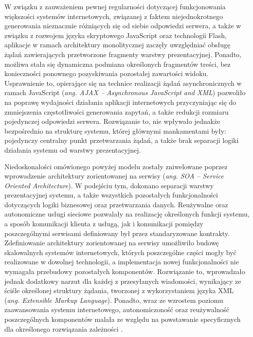W związku z zauważeniem pewnej regularności dotyczącej funkcjonowania większości systemów internetowych, związanej z faktem niejednokrotnego generowania nieznacznie różniących się od siebie odpowiedzi serwera, a także w związku z rozwojem języka skryptowego JavaScript oraz technologii Flash, aplikacje w ramach architektury monolitycznej zaczęły uwzględniać obsługę żądań zawierających przetworzone fragmenty warstwy prezentacyjnej. Ponadto, możliwa stała się dynamiczna podmiana określonych fragmentów treści, bez konieczności ponownego pozyskiwania pozostałej zawartości widoku. Usprawnienie to, opierające się na technice realizacji żądań asynchronicznych w ramach JavaScript (\textit{ang. AJAX -- Asynchronous JavaScript and XML}) pozwoliło na poprawę wydajności działania aplikacji internetowych przyczyniając się do zmniejszenia częstotliwości generowania zapytań, a także redukcji rozmiaru pojedynczej odpowiedzi serwera. Rozwiązanie to, nie wpływało jednakże bezpośrednio na strukturę systemu, której głównymi mankamentami były: pojedynczy centralny punkt przetwarzania żądań, a także brak separacji logiki działania systemu od warstwy prezentacyjnej.

Niedoskonałości omówionego powyżej modelu zostały zniwelowane poprzez wprowadzenie architektury zorientowanej na serwisy (\textit{ang. SOA -- Service Oriented Architecture}). W podejściu tym, dokonano separacji warstwy prezentacyjnej systemu, a także wszystkich pozostałych funkcjonalności dotyczących logiki biznesowej oraz przetwarzania danych. Reużywalne oraz autonomiczne usługi sieciowe pozwalały na realizację określonych funkcji systemu, a sposób komunikacji klienta z usługą, jak i komunikacji pomiędzy poszczególnymi serwisami definiowany był przez standaryzowane kontrakty. Zdefiniowanie architektury zorientowanej na serwisy umożliwiło budowę skalowalnych systemów internetowych, których poszczególne części mogły być realizowane w dowolnej technologii, a implementacja nowej funkcjonalności nie wymagała przebudowy pozostałych komponentów. Rozwiązanie to, wprowadzało jednak dodatkowy narzut dla każdej z przesyłanych wiadomości, wynikający ze ściśle określonej struktury żądania, tworzonej z wykorzystaniem języka XML (\textit{ang. Extensible Markup Language}). Ponadto, wraz ze wzrostem poziomu zaawansowania systemu internetowego, autonomiczoność oraz reużywalność poszczególnych komponentów malała ze względu na powstawanie specyficznych dla określonego rozwiązania zależności \cite{WANG2004309}.

